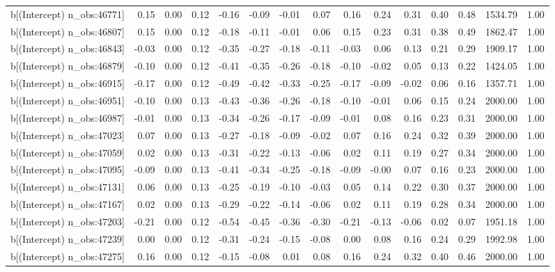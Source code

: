 \begin{table}[ht]
\begin{tabular}{rrrrrrrrrrrrrrr}
  b[(Intercept) n\_obs:46771] & 0.15 & 0.00 & 0.12 & -0.16 & -0.09 & -0.01 & 0.07 & 0.16 & 0.24 & 0.31 & 0.40 & 0.48 & 1534.79 & 1.00 \\ 
  b[(Intercept) n\_obs:46807] & 0.15 & 0.00 & 0.12 & -0.18 & -0.11 & -0.01 & 0.06 & 0.15 & 0.23 & 0.31 & 0.38 & 0.49 & 1862.47 & 1.00 \\ 
  b[(Intercept) n\_obs:46843] & -0.03 & 0.00 & 0.12 & -0.35 & -0.27 & -0.18 & -0.11 & -0.03 & 0.06 & 0.13 & 0.21 & 0.29 & 1909.17 & 1.00 \\ 
  b[(Intercept) n\_obs:46879] & -0.10 & 0.00 & 0.12 & -0.41 & -0.35 & -0.26 & -0.18 & -0.10 & -0.02 & 0.05 & 0.13 & 0.22 & 1424.05 & 1.00 \\ 
  b[(Intercept) n\_obs:46915] & -0.17 & 0.00 & 0.12 & -0.49 & -0.42 & -0.33 & -0.25 & -0.17 & -0.09 & -0.02 & 0.06 & 0.16 & 1357.71 & 1.00 \\ 
  b[(Intercept) n\_obs:46951] & -0.10 & 0.00 & 0.13 & -0.43 & -0.36 & -0.26 & -0.18 & -0.10 & -0.01 & 0.06 & 0.15 & 0.24 & 2000.00 & 1.00 \\ 
  b[(Intercept) n\_obs:46987] & -0.01 & 0.00 & 0.13 & -0.34 & -0.26 & -0.17 & -0.09 & -0.01 & 0.08 & 0.16 & 0.23 & 0.31 & 2000.00 & 1.00 \\ 
  b[(Intercept) n\_obs:47023] & 0.07 & 0.00 & 0.13 & -0.27 & -0.18 & -0.09 & -0.02 & 0.07 & 0.16 & 0.24 & 0.32 & 0.39 & 2000.00 & 1.00 \\ 
  b[(Intercept) n\_obs:47059] & 0.02 & 0.00 & 0.13 & -0.31 & -0.22 & -0.13 & -0.06 & 0.02 & 0.11 & 0.19 & 0.27 & 0.34 & 2000.00 & 1.00 \\ 
  b[(Intercept) n\_obs:47095] & -0.09 & 0.00 & 0.13 & -0.41 & -0.34 & -0.25 & -0.18 & -0.09 & -0.00 & 0.07 & 0.16 & 0.23 & 2000.00 & 1.00 \\ 
  b[(Intercept) n\_obs:47131] & 0.06 & 0.00 & 0.13 & -0.25 & -0.19 & -0.10 & -0.03 & 0.05 & 0.14 & 0.22 & 0.30 & 0.37 & 2000.00 & 1.00 \\ 
  b[(Intercept) n\_obs:47167] & 0.02 & 0.00 & 0.13 & -0.29 & -0.22 & -0.14 & -0.06 & 0.02 & 0.11 & 0.19 & 0.28 & 0.34 & 2000.00 & 1.00 \\ 
  b[(Intercept) n\_obs:47203] & -0.21 & 0.00 & 0.12 & -0.54 & -0.45 & -0.36 & -0.30 & -0.21 & -0.13 & -0.06 & 0.02 & 0.07 & 1951.18 & 1.00 \\ 
  b[(Intercept) n\_obs:47239] & 0.00 & 0.00 & 0.12 & -0.31 & -0.24 & -0.15 & -0.08 & 0.00 & 0.08 & 0.16 & 0.24 & 0.29 & 1992.98 & 1.00 \\ 
  b[(Intercept) n\_obs:47275] & 0.16 & 0.00 & 0.12 & -0.15 & -0.08 & 0.01 & 0.08 & 0.16 & 0.24 & 0.32 & 0.40 & 0.46 & 2000.00 & 1.00 \\ 

\end{tabular}
\end{table}
